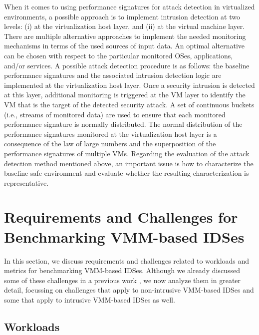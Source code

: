 When it comes to using performance signatures for attack detection in virtualized environments, a possible approach is to implement intrusion detection at two levels: (i) at the virtualization host layer, and (ii) at the virtual machine layer. There are multiple alternative approaches to implement the needed monitoring mechanisms in terms of the used sources of input data. An optimal alternative can be chosen with respect to the particular monitored OSes, applications, and/or services. A possible attack detection procedure is as follows: the baseline performance signatures and the associated intrusion detection logic are implemented at the virtualization host layer. Once a security intrusion is detected at this layer, additional monitoring is triggered at the VM layer to identify the VM that is the target of the detected security attack.  A set of continuous buckets (i.e., streams of monitored data) are used to ensure that each monitored performance signature is normally distributed.  The normal distribution of the performance signatures monitored at the virtualization host layer is a consequence of the law of large numbers and the superposition of the performance signatures of multiple VMs. Regarding the evaluation of the attack detection method mentioned above, an important issue is how to characterize the baseline safe environment and evaluate whether the resulting characterization is representative. 
 
\section{Requirements and Challenges for Benchmarking VMM-based IDSes}
\label{sec:challenges_on_benchmarking}

In this section, we discuss requirements and challenges related to workloads and metrics for benchmarking VMM-based IDSes. Although we already discussed some of these challenges in a previous work \cite{milenkoski:towards}, we now analyze them in greater detail, focussing on challenges that apply to non-intrusive VMM-based IDSes and some that apply to intrusive VMM-based IDSes as well. 

\subsection{Workloads}
\label{sec:workloads}

